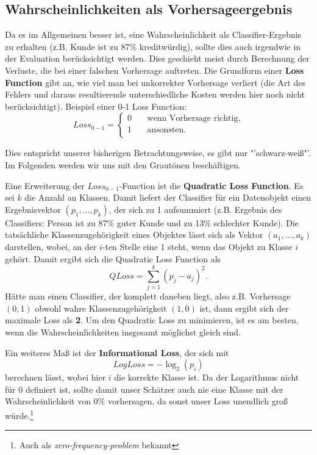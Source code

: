 \subsection{Wahrscheinlichkeiten als Vorhersageergebnis}
Da es im Allgemeinen besser ist, eine Wahrscheinlichkeit als Classifier-Ergebnis
zu erhalten (z.B. Kunde ist zu 87\% kreditwürdig), sollte dies auch irgendwie in
der Evaluation berücksichtigt werden. Dies geschieht meist durch Berechnung der
Verluste, die bei einer falschen Vorhersage auftreten. Die Grundform einer
\textbf{Loss Function} gibt an, wie viel man bei unkorrekter Vorhersage verliert
(die Art des Fehlers und daraus resultierende unterschiedliche Kosten werden hier
noch nicht berücksichtigt). Beispiel einer 0-1 Loss Function:
\[
	Loss_{0-1} = 
		\begin{cases}
			0 &\quad \text{wenn Vorhersage richtig,}\\
			1 &\quad \text{ansonsten.}\\
		\end{cases}
\]

Dies entspricht unserer bisherigen Betrachtungsweise, es gibt nur "'schwarz-weiß"'.
Im Folgenden werden wir uns mit den Grautönen beschäftigen.

Eine Erweiterung der \(Loss_{0-1}\)-Function
ist die \textbf{Quadratic Loss Function}. Es sei \(k\) die Anzahl
an Klassen. Damit liefert der Classifier für ein Datenobjekt
einen Ergebnisvektor \((p_1 , \dots , p_k)\),
der sich zu 1 aufsummiert
(z.B. Ergebnis des Classifiers: Person ist zu 87\% guter Kunde und zu 13\% schlechter
Kunde). Die tatsächliche Klassenzugehörigkeit eines Objektes lässt sich als
Vektor \((a_1, \dots , a_k)\) darstellen, wobei, an der \(i\)-ten Stelle eine 1 steht,
wenn das Objekt zu Klasse \(i\) gehört.
Damit ergibt sich die Quadratic Loss Function als
\[
	QLoss = \sum_{j=1}^k (p_j - a_j)^2.
\]
Hätte man einen Classifier, der komplett daneben liegt, also z.B. Vorhersage \((0,1)\)
obwohl wahre Klassenzugehörigkeit \((1,0)\) ist, dann ergibt sich der maximale Loss als
\textbf{2}. Um den Quadratic Loss zu minimieren, ist es am besten, wenn die 
Wahrscheinlichkeiten insgesamt möglichst gleich sind.

Ein weiteres Maß ist der \textbf{Informational Loss}, der sich mit 
\[
	LogLoss = -\log_2 (p_i)
\]
berechnen lässt, wobei hier \(i\) die korrekte Klasse ist.
Da der Logarithmus nicht für \(0\) definiert ist, sollte damit
unser Schätzer auch nie eine Klasse mit der Wahrscheinlichkeit von \(0\%\) vorhersagen,
da sonst unser Loss unendlich groß würde.\footnote{Auch als \textit{zero-frequency-problem}
bekannt}

